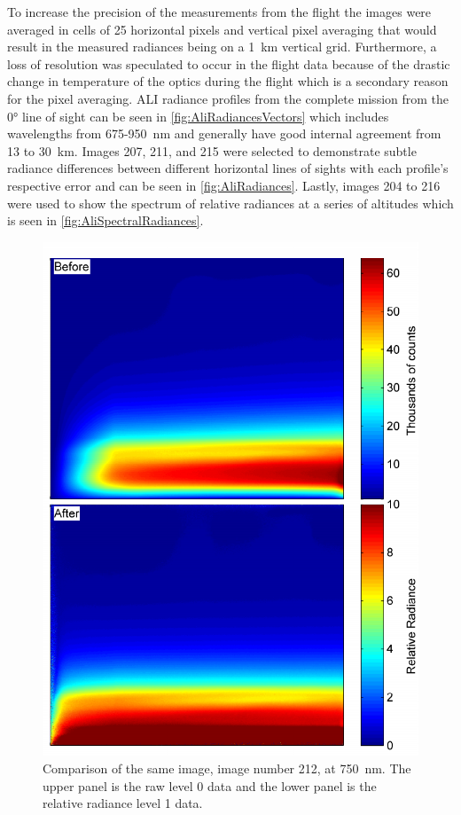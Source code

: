 To increase the precision of the measurements from the flight the images were averaged in cells of 25 horizontal pixels and vertical pixel averaging that would result in the measured radiances being on a 1~km vertical grid. Furthermore, a loss of resolution was speculated to occur in the flight data because of the drastic change in temperature of the optics during the flight which is a secondary reason for the pixel averaging. ALI radiance profiles from the complete mission from the 0\si{\degree} line of sight can be seen in \autoref{fig:AliRadiancesVectors} which includes wavelengths from 675-950~nm and generally have good internal agreement from 13 to 30~km. Images 207, 211, and 215 were selected to demonstrate subtle radiance differences between different horizontal lines of sights with each profile's respective error and can be seen in \autoref{fig:AliRadiances}. Lastly, images 204 to 216 were used to show the spectrum of relative radiances at a series of altitudes which is seen in \autoref{fig:AliSpectralRadiances}.

\begin{figure}
\includegraphics[width=1.0\textwidth]{./Images/5-2-BeforeAfterImage.pdf}
    \caption[TODO:Write This]{Comparison of the same image, image number 212, at 750~nm. The upper panel is the raw level 0 data and the lower panel is the relative radiance level 1 data.}
    \label{fig:5.2:BeforeAfterImages}
\end{figure}

